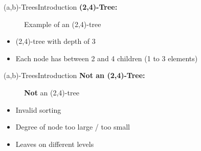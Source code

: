 
\begin{frame}{(a,b)-Trees}{Introduction}
  \textbf{(2,4)-Tree:}
    \begin{figure}
    \begin{adjustbox}{width=0.75\linewidth}
      
    \end{adjustbox}
    \caption{Example of an (2,4)-tree}
    \label{fig:a_b_tree:tree_introduction}
    \end{figure}
   \vspace{-1.0em}
  \begin{itemize}
    \item<2->
      (2,4)-tree with depth of 3
    \item<3->
      Each node has between 2 and 4 children (1 to 3 elements)
  \end{itemize}
\end{frame}


\begin{frame}{(a,b)-Trees}{Introduction}
  \textbf{Not an (2,4)-Tree:}
   \begin{figure}
    \begin{adjustbox}{width=0.5\linewidth}
      
    \end{adjustbox}
    \caption{\textbf{Not} an (2,4)-tree}
    \label{fig:a_b_tree:tree_invalid_introduction}
   \end{figure}
  \vspace{-1.0em}
  \begin{itemize}
    \item<2->
      Invalid sorting
    \item<3->
      Degree of node too large / too small
    \item<4->
      Leaves on different levels
  \end{itemize}
\end{frame}


